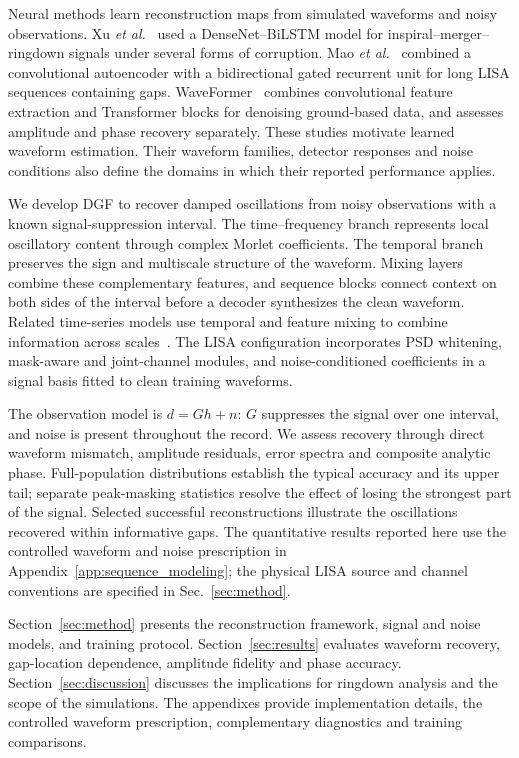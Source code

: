 \documentclass[10pt,prd,aps,a4paper,twocolumn,superscriptaddress,nofootinbib,floatfix]{revtex4-2}
\begin{document}
Neural methods learn reconstruction maps from simulated waveforms and noisy observations. Xu \textit{et al.}~\cite{Xu_2024} used a DenseNet--BiLSTM model for inspiral--merger--ringdown signals under several forms of corruption. Mao \textit{et al.}~\cite{Mao:2025cae} combined a convolutional autoencoder with a bidirectional gated recurrent unit for long LISA sequences containing gaps. WaveFormer~\cite{Wang:2024waveformer} combines convolutional feature extraction and Transformer blocks for denoising ground-based data, and assesses amplitude and phase recovery separately. These studies motivate learned waveform estimation. Their waveform families, detector responses and noise conditions also define the domains in which their reported performance applies.

We develop DGF to recover damped oscillations from noisy observations with a known signal-suppression interval. The time--frequency branch represents local oscillatory content through complex Morlet coefficients. The temporal branch preserves the sign and multiscale structure of the waveform. Mixing layers combine these complementary features, and sequence blocks connect context on both sides of the interval before a decoder synthesizes the clean waveform. Related time-series models use temporal and feature mixing to combine information across scales~\cite{TSMixer2023,TimeMixer2024}. The LISA configuration incorporates PSD whitening, mask-aware and joint-channel modules, and noise-conditioned coefficients in a signal basis fitted to clean training waveforms.

The observation model is $d=Gh+n$: $G$ suppresses the signal over one interval, and noise is present throughout the record. We assess recovery through direct waveform mismatch, amplitude residuals, error spectra and composite analytic phase. Full-population distributions establish the typical accuracy and its upper tail; separate peak-masking statistics resolve the effect of losing the strongest part of the signal. Selected successful reconstructions illustrate the oscillations recovered within informative gaps. The quantitative results reported here use the controlled waveform and noise prescription in Appendix~\ref{app:sequence_modeling}; the physical LISA source and channel conventions are specified in Sec.~\ref{sec:method}.

Section~\ref{sec:method} presents the reconstruction framework, signal and noise models, and training protocol. Section~\ref{sec:results} evaluates waveform recovery, gap-location dependence, amplitude fidelity and phase accuracy. Section~\ref{sec:discussion} discusses the implications for ringdown analysis and the scope of the simulations. The appendixes provide implementation details, the controlled waveform prescription, complementary diagnostics and training comparisons.
\end{document}
